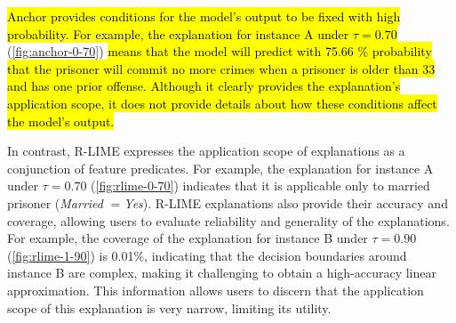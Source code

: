 \documentclass[runningheads]{llncs}
\begin{document}
{\hl{
  Anchor provides conditions for the model's output to be fixed with high
  probability.
  For example,
  the explanation for instance A under $\tau=0.70$
} (\cref{fig:anchor-0-70})
\hl{
  means that the model will predict with 75.66 \% probability
  that the prisoner will commit no more crimes
  when a prisoner is older than 33 and has one prior offense.
  Although it clearly provides the explanation's application scope,
  it does not provide details about how these conditions affect the model's output.
}

In contrast, R-LIME expresses the application scope of explanations
as a conjunction of feature predicates.
For example, the explanation for instance A
under $\tau=0.70$ (\cref{fig:rlime-0-70}) indicates that it is applicable
only to married prisoner (\emph{Married} $=$\emph{Yes}).
R-LIME explanations also provide their accuracy and coverage,
allowing users to evaluate reliability and generality of the explanations.
For example, the coverage of the explanation for instance B under $\tau=0.90$
(\cref{fig:rlime-1-90}) is 0.01\%,
indicating that the decision boundaries around instance B are complex,
making it challenging to obtain a high-accuracy linear approximation.
This information allows users to discern that
the application scope of this explanation is very narrow, limiting its utility.

}
\end{document}
